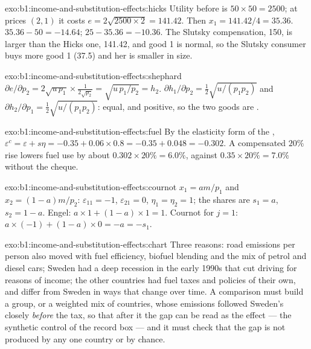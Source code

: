 \begin{solution}{exo:b1:income-and-substitution-effects:hicks}
Utility before is $50 \times 50 = 2500$; at prices $(2, 1)$ it costs
$e = 2\sqrt{2500 \times 2} = 141.42$. Then $x_1 = 141.42/4 = 35.36$.  $35.36 - 50 = -14.64$;  $25 - 35.36 = -10.36$. The Slutsky
compensation, 150, is larger than the Hicks one, 141.42, and good 1 is
normal, so the Slutsky consumer buys more good 1 (37.5) and her
 is smaller in size.
\end{solution}

\begin{solution}{exo:b1:income-and-substitution-effects:shephard}
$\partial e/\partial p_2 = 2\sqrt{u\,p_1} \times \tfrac{1}{2\sqrt{p_2}} = \sqrt{u\,p_1/p_2} = h_2$.
$\partial h_1/\partial p_2 = \tfrac12\sqrt{u/(p_1p_2)}$ and
$\partial h_2/\partial p_1 = \tfrac12\sqrt{u/(p_1p_2)}$: equal, and positive, so the
two goods are .
\end{solution}

\begin{solution}{exo:b1:income-and-substitution-effects:fuel}
By the elasticity form of the ,
$\varepsilon^c = \varepsilon + s\eta = -0.35 + 0.06 \times 0.8 = -0.35 + 0.048 = -0.302$.
A compensated $20\%$ rise lowers fuel use by about $0.302 \times 20\% = 6.0\%$,
against $0.35 \times 20\% = 7.0\%$ without the cheque.
\end{solution}

\begin{solution}{exo:b1:income-and-substitution-effects:cournot}
$x_1 = am/p_1$ and $x_2 = (1 - a)m/p_2$: $\varepsilon_{11} = -1$, $\varepsilon_{21} = 0$,
$\eta_1 = \eta_2 = 1$; the shares are $s_1 = a$, $s_2 = 1 - a$. Engel:
$a \times 1 + (1 - a) \times 1 = 1$. Cournot for $j = 1$:
$a \times (-1) + (1 - a) \times 0 = -a = -s_1$.
\end{solution}

\begin{solution}{exo:b1:income-and-substitution-effects:chart}
Three reasons: road emissions per person also moved with fuel efficiency,
biofuel blending and the mix of petrol and diesel cars; Sweden had a deep
recession in the early 1990s that cut driving for reasons of income; the
other countries had fuel taxes and policies of their own, and differ from
Sweden in ways that change over time. A comparison must build a group, or a
weighted mix of countries, whose emissions followed Sweden's closely
\emph{before} the tax, so that after it the gap can be read as the effect
--- the synthetic control of the record box --- and it must check that the
gap is not produced by any one country or by chance.
\end{solution}

